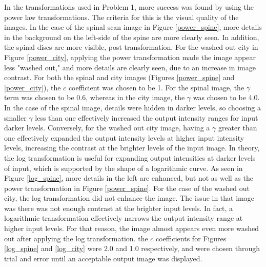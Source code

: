 \documentclass[./rarnold_report2.tex]{subfiles}
\begin{document}
\noindent
In the transformations used in Problem 1, more success was found by using the power law transformations.  The criteria for this is the visual quality of the images.  In the case of the spinal scan image in Figure \ref{power_spine}, more details in the background on the left-side of the spine are more clearly seen.  In addition, the spinal discs are more visible, post transformation.  For the washed out city in Figure \ref{power_city}, applying the power transformation made the image appear less "washed out," and more details are clearly seen, due to an increase in image contrast.  For both the spinal and city images (Figures \ref{power_spine} and \ref{power_city}), the $c$ coefficient was chosen to be 1. For the spinal image, the $\gamma$ term was chosen to be 0.6, whereas in the city image, the $\gamma$ was chosen to be 4.0.  In the case of the spinal image, details were hidden in darker levels, so choosing a smaller $\gamma$ less than one effectively increased the output intensity ranges for input darker levels.  Conversely, for the washed out city image, having a $\gamma$ greater than one effectively expanded the output intensity levels at higher input intensity levels, increasing the contrast at the brighter levels of the input image.  In theory, the log transformation is useful for expanding output intensities at darker levels of input, which is supported by the shape of a logarithmic curve.  As seen in Figure \ref{log_spine}, more details in the left are enhanced, but not as well as the power transformation in Figure \ref{power_spine}. For the case of the washed out city, the log transformation did not enhance the image.  The issue in that image was there was not enough contrast at the brighter input levels.  In fact, a logarithmic transformation effectively narrows the output intensity range at higher input levels.  For that reason, the image almost appears even more washed out after applying the log transformation.  the $c$ coefficients for Figures \ref{log_spine} and \ref{log_city} were 2.0 and 1.0 respectively, and were chosen through trial and error until an acceptable output image was displayed.
\\ \\
\end{document}
